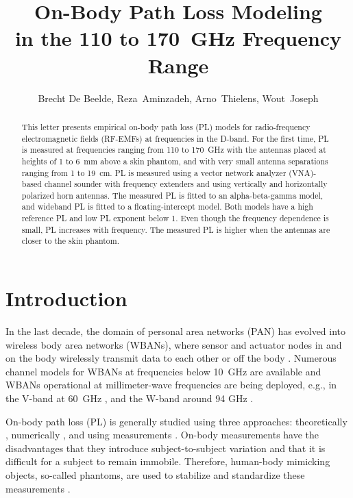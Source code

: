 \documentclass[preprint]{rsl}
\title{On-Body Path Loss Modeling\\ in the 110 to 170~GHz Frequency Range}
\author{Brecht De Beelde,
Reza~Aminzadeh,
Arno~Thielens,
Wout~Joseph
}
\begin{document}
\maketitle

%
%

\begin{abstract}
This letter presents empirical on-body path loss (PL) models for radio-frequency electromagnetic fields (RF-EMFs) at frequencies in the D-band. 
For the first time, PL is measured at frequencies ranging from 110 to 170~GHz with the antennas placed at heights of 1 to 6~mm above a skin phantom, and with very small antenna separations ranging from 1 to 19~cm.
PL is measured using a vector network analyzer (VNA)-based channel sounder with frequency extenders and using vertically and horizontally polarized horn antennas. 
The measured PL is fitted to an alpha-beta-gamma model, and wideband PL is fitted to a floating-intercept model.
Both models have a high reference PL and low PL exponent below 1. 
Even though the frequency dependence is small, PL increases with frequency. 
The measured PL is higher when the antennas are closer to the skin phantom.
\end{abstract}

\section{Introduction\label{sect:intro}}

In the last decade, the domain of personal area networks (PAN) has evolved into wireless body area networks (WBANs), where sensor and actuator nodes in and on the body wirelessly transmit data to each other \cite{Patel2010} or off the body \cite{Marinova2015}. 
Numerous channel models for WBANs at frequencies below 10~GHz are available \cite{VanRoy2010} and WBANs operational at millimeter-wave frequencies are being deployed, e.g., in the V-band at 60~GHz \cite{Chahat2013,Petrillo2014,Aminzadeh2021_tap}, and the W-band around 94 GHz \cite{Brizzi2013,Ali2022}.

On-body path loss (PL) is generally studied using three approaches: theoretically \cite{Chahat2013,Petrillo2014}, numerically \cite{Reusens2009}, and using measurements \cite{Chahat2013,Reusens2009,Aminzadeh2021_tap}. 
On-body measurements have the disadvantages that they introduce subject-to-subject variation \cite{Proesmans2022} and that it is difficult for a subject to remain immobile. 
Therefore, human-body mimicking objects, so-called phantoms, are used to stabilize and standardize these measurements \cite{Chahat2013}. 
\end{document}
